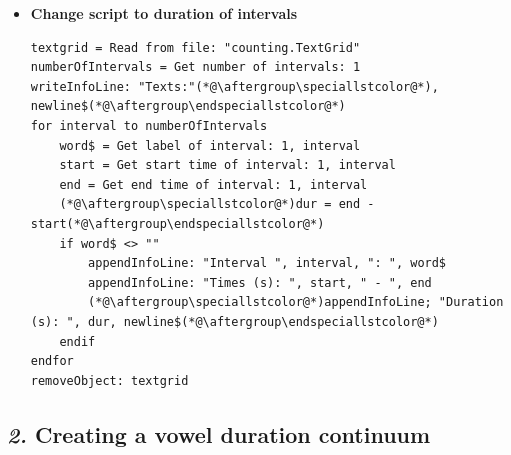 \documentclass[12pt, english]{article}
\begin{document}
\begin{itemize}
    \item \textbf{Change script to duration of intervals} \vspace{5pt}
\begin{lstlisting}[xleftmargin=0pt]
textgrid = Read from file: "counting.TextGrid"
numberOfIntervals = Get number of intervals: 1
writeInfoLine: "Texts:"(*@\aftergroup\speciallstcolor@*), newline$(*@\aftergroup\endspeciallstcolor@*)
for interval to numberOfIntervals
	word$ = Get label of interval: 1, interval
	start = Get start time of interval: 1, interval
	end = Get end time of interval: 1, interval
    (*@\aftergroup\speciallstcolor@*)dur = end - start(*@\aftergroup\endspeciallstcolor@*)
	if word$ <> ""
		appendInfoLine: "Interval ", interval, ": ", word$
		appendInfoLine: "Times (s): ", start, " - ", end
        (*@\aftergroup\speciallstcolor@*)appendInfoLine; "Duration (s): ", dur, newline$(*@\aftergroup\endspeciallstcolor@*)
	endif
endfor
removeObject: textgrid
\end{lstlisting} \vspace{10pt}

\end{itemize}


\subsection*{\emph{2.} Creating a vowel duration continuum}
\end{document}
